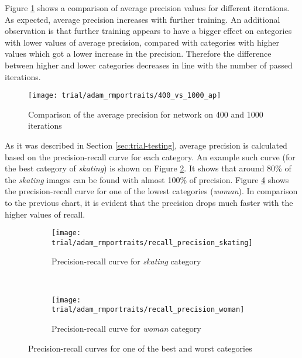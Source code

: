     Figure \ref{fig:trial-400-vs-1000} shows a comparison of average precision values for different iterations. As expected, average precision increases with further training. An additional observation is that further training appears to have a bigger effect on categories with lower values of average precision, compared with categories with higher values which got a lower increase in the precision. Therefore the difference between higher and lower categories decreases in line with the number of passed iterations.
    
    \begin{figure}[H]
        \centering
        \texttt{[image: trial/adam\_rmportraits/400\_vs\_1000\_ap]}
        \caption[Trial experiment. Comparison of the average precision for network on 400 and 1000 iterations]{Comparison of the average precision for network on 400 and 1000 iterations}
        \label{fig:trial-400-vs-1000}
    \end{figure}
    
    As it was described in Section \ref{sec:trial-testing}, average precision is calculated based on the precision-recall curve for each category. An example such curve (for the best category of \textit{skating}) is shown on Figure \ref{fig:trial-precision-recall-skating}. It shows that around 80\% of the \textit{skating} images can be found with almost 100\% of precision. Figure \ref{fig:trial-precision-recall-woman} shows the precision-recall curve for one of the lowest categories (\textit{woman}). In comparison to the previous chart, it is evident that the precision drops much faster with the higher values of recall.
    
    \begin{figure}[H]
    \centering
    \begin{subfigure}[a]{0.9\textwidth}
        \texttt{[image: trial/adam\_rmportraits/recall\_precision\_skating]}
        \caption[Trial experiment. Precision-recall curve for \textit{skating} category]{Precision-recall curve for \textit{skating} category}
        \label{fig:trial-precision-recall-skating}
    \end{subfigure}
    \\
    \begin{subfigure}[a]{0.9\textwidth}
        \texttt{[image: trial/adam\_rmportraits/recall\_precision\_woman]}
        \caption{Precision-recall curve for \textit{woman} category}
        \label{fig:trial-precision-recall-woman}
    \end{subfigure}
    \caption[Trial experiment. Precision-recall curves for one of the best and worst categories]{Precision-recall curves for one of the best and worst categories}
    \end{figure}
    

